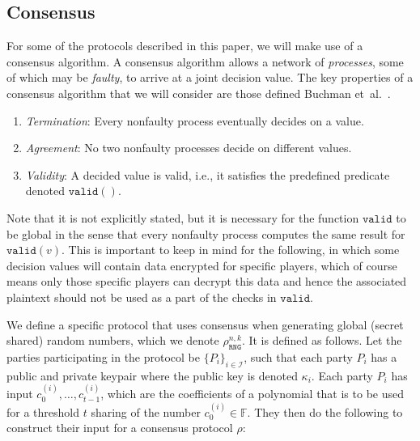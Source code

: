 \documentclass{article}
\newcommand\paper{paper}
\theoremstyle{remark}
\newcommand{\F}{\mathbb{F}}
\begin{document}
\subsection{Consensus}

\newcommand{\consrng}[2]{\rho_\texttt{RNG}^{#1, #2}}

For some of the protocols described in this \paper{}, we will make use of a
consensus algorithm. A consensus algorithm allows a network of
\textit{processes}, some of which may be \textit{faulty}, to arrive at a joint
decision value. The key properties of a consensus algorithm that we will
consider are those defined Buchman et~al.~\cite{buchman_2018}.

\begin{enumerate}
	\item \textit{Termination}: Every nonfaulty process eventually decides on a
		value.
	\item \textit{Agreement}: No two nonfaulty processes decide on different
		values.
	\item \textit{Validity}: A decided value is valid, i.e., it satisfies the
		predefined predicate denoted $\texttt{valid}()$.
\end{enumerate}

Note that it is not explicitly stated, but it is necessary for the function
$\texttt{valid}$ to be global in the sense that every nonfaulty process
computes the same result for $\texttt{valid}(v)$. This is important to keep in
mind for the following, in which some decision values will contain data
encrypted for specific players, which of course means only those specific
players can decrypt this data and hence the associated plaintext should not be
used as a part of the checks in $\texttt{valid}$.

We define a specific protocol that uses consensus when generating global
(secret shared) random numbers, which we denote $\consrng{n}{k}$. It is defined
as follows. Let the parties participating in the protocol be ${\{P_i\}}_{i \in
\mathcal{I}}$, such that each party $P_i$ has a public and private keypair
where the public key is denoted $\kappa_i$. Each party $P_i$ has input
$c_0^{(i)}, \ldots, c_{t-1}^{(i)}$, which are the coefficients of a polynomial
that is to be used for a threshold $t$ sharing of the number $c_0^{(i)} \in
\F$. They then do the following to construct their input for a consensus
protocol $\rho$:
\end{document}
